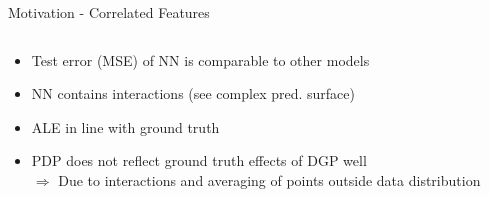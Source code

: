 \documentclass[10pt,compress,t,notes=noshow, xcolor=table]{beamer}
\begin{document}
\begin{frame}{Motivation - Correlated Features}
\begin{columns}[T, totalwidth=\textwidth]
\begin{column}{0.4\textwidth}
\begin{itemize}
\item Test error (MSE) of NN is comparable to other models
\item NN contains interactions (see complex pred. surface)
\item<2> ALE in line with ground truth
\item<2> PDP does not reflect ground truth effects of DGP well \\
$\Rightarrow$ Due to interactions and averaging of points outside data distribution
\end{itemize}

\end{column}
\end{columns}

\end{frame}
\end{document}
